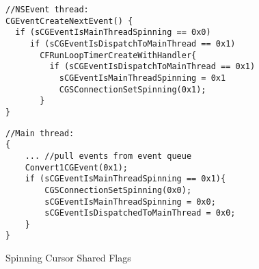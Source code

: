 \begin{figure}[t]
\begin{minipage}[t]{0.48\textwidth}
\begin{lstlisting}
//NSEvent thread:
CGEventCreateNextEvent() {
  if (sCGEventIsMainThreadSpinning == 0x0)
     if (sCGEventIsDispatchToMainThread == 0x1)
       CFRunLoopTimerCreateWithHandler{
         if (sCGEventIsDispatchToMainThread == 0x1)
           sCGEventIsMainThreadSpinning = 0x1
           CGSConnectionSetSpinning(0x1);
       }
}
\end{lstlisting}
\end{minipage}
\begin{minipage}[t]{0.48\textwidth}
\begin{lstlisting}
//Main thread:
{
	... //pull events from event queue
	Convert1CGEvent(0x1);
	if (sCGEventIsMainThreadSpinning == 0x1){
  		CGSConnectionSetSpinning(0x0);
  		sCGEventIsMainThreadSpinning = 0x0;
  		sCGEventIsDispatchedToMainThread = 0x0;
	}
}
\end{lstlisting}
\end{minipage}
    \caption{Spinning Cursor Shared Flags}
    \label{fig:spinningcursorsharedflags}
\end{figure}
